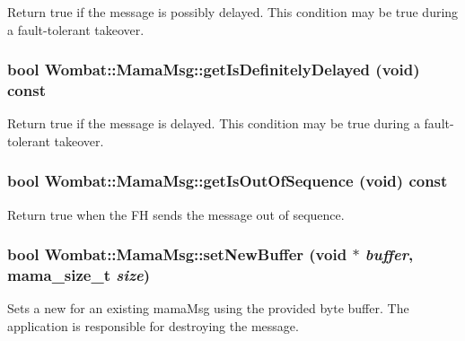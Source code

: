 Return true if the message is possibly delayed. This condition may be true during a fault-\/tolerant takeover. \hypertarget{classWombat_1_1MamaMsg_a8fe32c62e0c88639c9e022337d4c7228}{
\subsubsection[{getIsDefinitelyDelayed}]{\setlength{\rightskip}{0pt plus 5cm}bool Wombat::MamaMsg::getIsDefinitelyDelayed (void) const}}
\label{classWombat_1_1MamaMsg_a8fe32c62e0c88639c9e022337d4c7228}


Return true if the message is delayed. This condition may be true during a fault-\/tolerant takeover. \hypertarget{classWombat_1_1MamaMsg_a2b01886c287dd83c9b9a9aa20a9d9267}{
\subsubsection[{getIsOutOfSequence}]{\setlength{\rightskip}{0pt plus 5cm}bool Wombat::MamaMsg::getIsOutOfSequence (void) const}}
\label{classWombat_1_1MamaMsg_a2b01886c287dd83c9b9a9aa20a9d9267}


Return true when the FH sends the message out of sequence. \hypertarget{classWombat_1_1MamaMsg_acd0564688af724fd2d1f245a785da0ba}{
\subsubsection[{setNewBuffer}]{\setlength{\rightskip}{0pt plus 5cm}bool Wombat::MamaMsg::setNewBuffer (void $\ast$ {\em buffer}, \/  {\bf mama\_\-size\_\-t} {\em size})}}
\label{classWombat_1_1MamaMsg_acd0564688af724fd2d1f245a785da0ba}


Sets a new for an existing mamaMsg using the provided byte buffer. The application is responsible for destroying the message.


